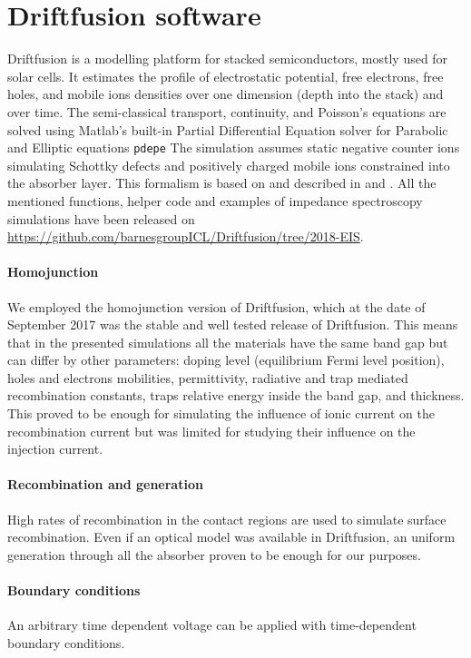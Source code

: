 \section{Driftfusion software}
	Driftfusion is a modelling platform for stacked semiconductors, mostly used for solar cells.
	It estimates the profile of electrostatic potential, free electrons, free holes, and mobile ions densities over one dimension (depth into the stack) and over time.
	The semi-classical transport, continuity, and Poisson's equations are solved using Matlab's built-in Partial Differential Equation solver for Parabolic and Elliptic equations \texttt{pdepe}
	The simulation assumes static negative counter ions simulating Schottky defects \cite{Walsh2015} and positively charged mobile ions constrained into the absorber layer.
	This formalism is based on  and described in  and .
	All the mentioned functions, helper code and examples of impedance spectroscopy simulations have been released on \url{https://github.com/barnesgroupICL/Driftfusion/tree/2018-EIS}.

	\paragraph{Homojunction}
	We employed the homojunction version of Driftfusion, which at the date of September 2017 was the stable and well tested release of Driftfusion.
	This means that in the presented simulations all the materials have the same band gap but can differ by other parameters: doping level (equilibrium Fermi level position), holes and electrons mobilities, permittivity, radiative and trap mediated recombination constants, traps relative energy inside the band gap, and thickness.
	This proved to be enough for simulating the influence of ionic current on the recombination current but was limited for studying their influence on the injection current.

	\paragraph{Recombination and generation}
	High rates of recombination in the contact regions are used to simulate surface recombination.
	Even if an optical model was available in Driftfusion, an uniform generation through all the absorber proven to be enough for our purposes.

	\paragraph{Boundary conditions}
	An arbitrary time dependent voltage can be applied with time\hyp{}dependent boundary conditions.
	
